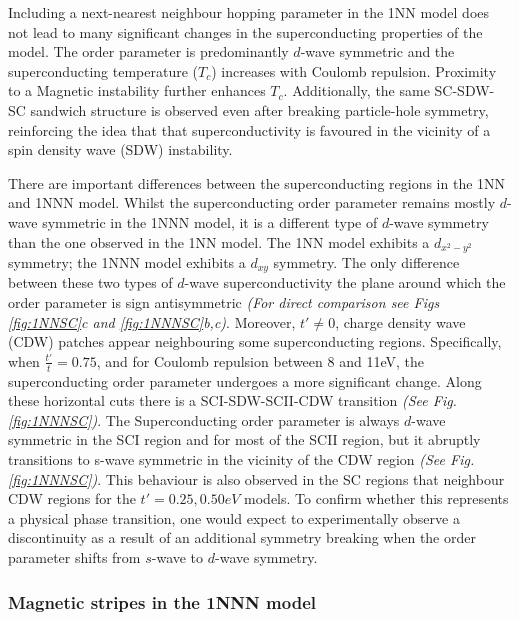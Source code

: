 \documentclass[12pt]{article}
\begin{document}
Including a next-nearest neighbour hopping parameter in the 1NN model does not lead to
many significant changes in the superconducting properties of the model. The order parameter is predominantly $d$-wave symmetric and the  superconducting temperature ($T_c$) increases
with Coulomb repulsion. Proximity to a Magnetic instability further enhances $T_c$.
Additionally, the same SC-SDW-SC sandwich structure is observed even after breaking particle-hole symmetry, reinforcing the 
idea that that superconductivity is favoured in the vicinity of a  spin density wave (SDW) instability. \par
\medskip
\noindent There are important differences between the superconducting regions in the 1NN and 1NNN model. 
Whilst the superconducting order parameter remains mostly $d$-wave symmetric in the 1NNN model, it is a different type
of $d$-wave symmetry than the one observed in the 1NN model. The 1NN model exhibits a $d_{x^2-y^2}$ symmetry; the 1NNN model
exhibits a $d_{xy}$ symmetry\cite{butler2012point}. The only difference between these two types of $d$-wave superconductivity the plane around which the order parameter is sign antisymmetric
\textit{(For direct comparison see Figs \ref{fig:1NNSC}c and \ref{fig:1NNNSC}b,c)}. 
Moreover,  $t' \neq 0 $, charge density wave (CDW) patches appear neighbouring some superconducting regions.
Specifically, when $\frac{t'}{t} = 0.75$, and for Coulomb repulsion between 8 and 11eV, the superconducting order parameter undergoes a more significant change.
Along these horizontal cuts there is a SCI-SDW-SCII-CDW transition \textit{(See Fig.\ref{fig:1NNNSC})}. The Superconducting order parameter 
is always $d$-wave symmetric in the SCI region and for most of the SCII region, but it abruptly transitions to 
s-wave symmetric in the vicinity of the CDW region \textit{(See Fig.\ref{fig:1NNNSC})}. This behaviour is also observed in the SC regions that neighbour CDW regions for 
the $t' = 0.25, 0.50eV$ models. To confirm whether this represents a physical phase transition, one would expect to experimentally observe a 
discontinuity as a result of an additional symmetry breaking when the order parameter shifts from $s$-wave to $d$-wave symmetry.





\subsubsection{Magnetic stripes in the 1NNN model}
\label{subsec:Stripes1NNN}
\end{document}
